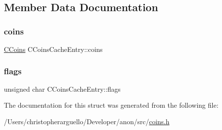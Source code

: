 \subsection{Member Data Documentation}
\mbox{\label{struct_c_coins_cache_entry_a343585f1fcb810f9c21fc25ae42a1eba}} 
\subsubsection{\texorpdfstring{coins}{coins}}
{\footnotesize\ttfamily \mbox{\hyperlink{class_c_coins}{C\+Coins}} C\+Coins\+Cache\+Entry\+::coins}

\mbox{\label{struct_c_coins_cache_entry_a05225c349f51777385e3a1c9b0eeaaed}} 
\subsubsection{\texorpdfstring{flags}{flags}}
{\footnotesize\ttfamily unsigned char C\+Coins\+Cache\+Entry\+::flags}



The documentation for this struct was generated from the following file\+:\begin{DoxyCompactItemize}
\item 
/\+Users/christopherarguello/\+Developer/anon/src/\mbox{\hyperlink{coins_8h}{coins.\+h}}\end{DoxyCompactItemize}
